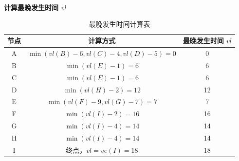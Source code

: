\documentclass[lang=cn,newtx,10pt,scheme=chinese]{elegantbook}
\begin{document}
\textbf{计算最晚发生时间 $vl$}
\begin{table}[h]
    \centering
    \begin{tabular}{c|c|c}
        \toprule
        \textbf{节点} & \textbf{计算方式} & \textbf{最晚发生时间 $vl$} \\
        \midrule
        A & $\min(vl(B) - 6, vl(C) - 4, vl(D) - 5) = 0$ & 0 \\
        B & $\min(vl(E) - 1) = 6$ & 6 \\
        C & $\min(vl(E) - 1) = 6$ & 6 \\
        D & $\min(vl(H) - 2) = 12$ & 12 \\
        E & $\min(vl(F) - 9, vl(G) - 7) = 7$ & 7 \\
        F & $\min(vl(I) - 2) = 16$ & 16 \\
        G & $\min(vl(I) - 4) = 14$ & 14 \\
        H & $\min(vl(I) - 4) = 14$ & 14 \\
        I & 终点，$vl = ve(I) = 18$ & 18 \\
        \bottomrule
    \end{tabular}
    \caption{最晚发生时间计算表}
\end{table}
\end{document}
